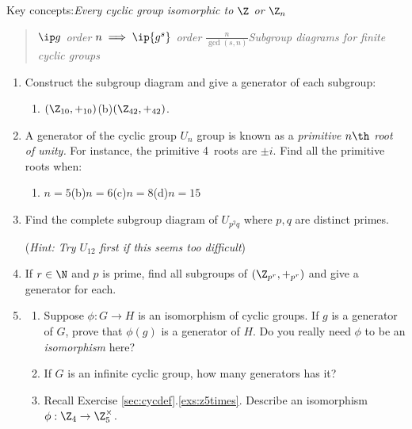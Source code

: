 \begin{exercises}
	Key concepts:\quad \emph{Every cyclic group isomorphic to $\Z$ or $\Z_n$}
	\begin{quote}
		\emph{$\ip g$ order $n\implies \ip{g^s}$ order $\frac n{\gcd(s,n)}$\qquad Subgroup diagrams for finite cyclic groups}
	\end{quote}
	
	
	\begin{enumerate}
		\item Construct the subgroup diagram and give a generator of each subgroup:
		\begin{enumerate}
		  \item $(\Z_{10},+_{10})$\qquad\qquad (b)\lstsp $(\Z_{42},+_{42})$.
		\end{enumerate}
	  
	  
	  \item A generator of the cyclic group $U_n$ group is known as a \emph{primitive $n\th$ root of unity.} For instance, the primitive 4\th\ roots are $\pm i$. Find all the primitive roots when:
	  \begin{enumerate}
	    \item $n=5$\hfill (b)\lstsp $n=6$\hfill (c)\lstsp $n=8$\hfill (d)\lstsp $n=15$\hspace*{\fill}\hspace*{\fill}
	  \end{enumerate}
		
		
		\item Find the complete subgroup diagram of $U_{p^2q}$ where $p,q$ are distinct primes.\par
		(\emph{Hint: Try $U_{12}$ first if this seems too difficult})
	  
	  
	  \item If $r\in\N$ and $p$ is prime, find all subgroups of $(\Z_{p^r},+_{p^r})$ and give a generator for each.
		
		
	  \item\begin{enumerate}
	    \item Suppose $\phi:G\to H$ is an isomorphism of cyclic groups. If $g$ is a generator of $G$, prove that $\phi(g)$ is a generator of $H$. Do you really need $\phi$ to be an \emph{isomorphism} here?
	  
	  	\item If $G$ is an infinite cyclic group, how many generators has it?
	  	
			\item Recall Exercise \ref*{sec:cycdef}.\ref{exs:z5times}. Describe an isomorphism $\phi:\Z_4\to\Z_5^\times$.
	  \end{enumerate} 
	  

\end{enumerate}
\end{exercises}
